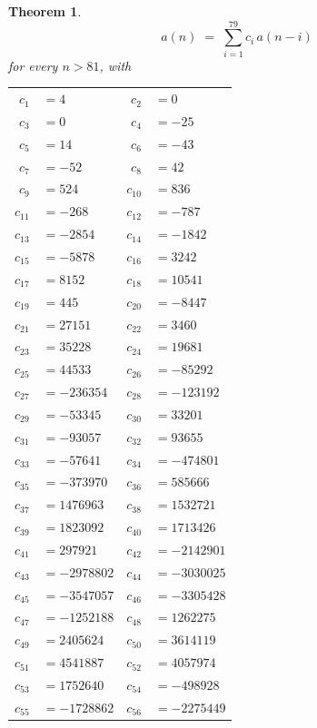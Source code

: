 \documentclass[11pt,a4paper]{article}
\theoremstyle{plain}
\newtheorem{theorem}{Theorem}
\theoremstyle{definition}
\begin{document}
\begin{theorem}
\[
a(n)\;=\;\sum_{i=1}^{79}c_i\,a(n-i)
\]
for every $n>81$, with
\begin{center}\footnotesize
\begin{tabular}{r@{\,}l@{\qquad}r@{\,}l}
$c_{1}$ & $=4$ & $c_{2}$ & $=0$ \\
$c_{3}$ & $=0$ & $c_{4}$ & $=-25$ \\
$c_{5}$ & $=14$ & $c_{6}$ & $=-43$ \\
$c_{7}$ & $=-52$ & $c_{8}$ & $=42$ \\
$c_{9}$ & $=524$ & $c_{10}$ & $=836$ \\
$c_{11}$ & $=-268$ & $c_{12}$ & $=-787$ \\
$c_{13}$ & $=-2854$ & $c_{14}$ & $=-1842$ \\
$c_{15}$ & $=-5878$ & $c_{16}$ & $=3242$ \\
$c_{17}$ & $=8152$ & $c_{18}$ & $=10541$ \\
$c_{19}$ & $=445$ & $c_{20}$ & $=-8447$ \\
$c_{21}$ & $=27151$ & $c_{22}$ & $=3460$ \\
$c_{23}$ & $=35228$ & $c_{24}$ & $=19681$ \\
$c_{25}$ & $=44533$ & $c_{26}$ & $=-85292$ \\
$c_{27}$ & $=-236354$ & $c_{28}$ & $=-123192$ \\
$c_{29}$ & $=-53345$ & $c_{30}$ & $=33201$ \\
$c_{31}$ & $=-93057$ & $c_{32}$ & $=93655$ \\
$c_{33}$ & $=-57641$ & $c_{34}$ & $=-474801$ \\
$c_{35}$ & $=-373970$ & $c_{36}$ & $=585666$ \\
$c_{37}$ & $=1476963$ & $c_{38}$ & $=1532721$ \\
$c_{39}$ & $=1823092$ & $c_{40}$ & $=1713426$ \\
$c_{41}$ & $=297921$ & $c_{42}$ & $=-2142901$ \\
$c_{43}$ & $=-2978802$ & $c_{44}$ & $=-3030025$ \\
$c_{45}$ & $=-3547057$ & $c_{46}$ & $=-3305428$ \\
$c_{47}$ & $=-1252188$ & $c_{48}$ & $=1262275$ \\
$c_{49}$ & $=2405624$ & $c_{50}$ & $=3614119$ \\
$c_{51}$ & $=4541887$ & $c_{52}$ & $=4057974$ \\
$c_{53}$ & $=1752640$ & $c_{54}$ & $=-498928$ \\
$c_{55}$ & $=-1728862$ & $c_{56}$ & $=-2275449$ \\

\end{tabular}
\end{center}
\end{theorem}
\end{document}

